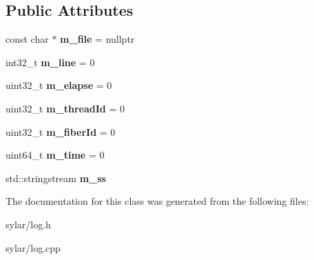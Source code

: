 \subsection*{Public Attributes}
\begin{DoxyCompactItemize}
\item 
\hypertarget{classsylar_1_1LogEvent_a2776adde38832e4c4e619bd3251e7c9e}{const char $\ast$ {\bfseries m\-\_\-file} = nullptr}\label{classsylar_1_1LogEvent_a2776adde38832e4c4e619bd3251e7c9e}

\item 
\hypertarget{classsylar_1_1LogEvent_ac156e6de1d18cc5931085d1bb5dc0597}{int32\-\_\-t {\bfseries m\-\_\-line} = 0}\label{classsylar_1_1LogEvent_ac156e6de1d18cc5931085d1bb5dc0597}

\item 
\hypertarget{classsylar_1_1LogEvent_a2bc0739457c1a8eeb805db96ada048e5}{uint32\-\_\-t {\bfseries m\-\_\-elapse} = 0}\label{classsylar_1_1LogEvent_a2bc0739457c1a8eeb805db96ada048e5}

\item 
\hypertarget{classsylar_1_1LogEvent_a3d32d07e648a088b5a13bec39d64ea85}{uint32\-\_\-t {\bfseries m\-\_\-thread\-Id} = 0}\label{classsylar_1_1LogEvent_a3d32d07e648a088b5a13bec39d64ea85}

\item 
\hypertarget{classsylar_1_1LogEvent_a20245718662f466df874cf506c15eaba}{uint32\-\_\-t {\bfseries m\-\_\-fiber\-Id} = 0}\label{classsylar_1_1LogEvent_a20245718662f466df874cf506c15eaba}

\item 
\hypertarget{classsylar_1_1LogEvent_a62a98a5793c644ac3d3e080ecc6eb6ff}{uint64\-\_\-t {\bfseries m\-\_\-time} = 0}\label{classsylar_1_1LogEvent_a62a98a5793c644ac3d3e080ecc6eb6ff}

\item 
\hypertarget{classsylar_1_1LogEvent_a6aef7a1b86b796d86ebc253c14931d57}{std\-::stringstream {\bfseries m\-\_\-ss}}\label{classsylar_1_1LogEvent_a6aef7a1b86b796d86ebc253c14931d57}

\end{DoxyCompactItemize}


The documentation for this class was generated from the following files\-:\begin{DoxyCompactItemize}
\item 
sylar/log.\-h\item 
sylar/log.\-cpp\end{DoxyCompactItemize}
